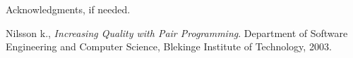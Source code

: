 \documentclass{sigplanconf}
\begin{document}
Acknowledgments, if needed.





\begin{thebibliography}{}
\softraggedright


  Nilsson k.,
  \emph{Increasing Quality with Pair Programming}.
  Department of Software Engineering and Computer Science,
  Blekinge Institute of Technology,
  2003.

\end{thebibliography}
\end{document}
